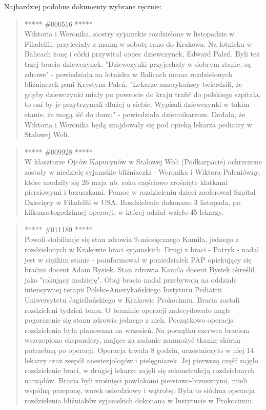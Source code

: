 \documentclass[11pt,a4paper]{article}
\begin{document}
Najbardziej podobne dokumenty wybrane ręcznie:

\begin{quote} ***** \#000516 *****\\ Wiktoria i Weronika, siostry syjamskie
rozdzielone w listopadzie w Filadelfii, przyleciały z mamą w sobotę rano do
Krakowa. Na lotnisku w Balicach żonę i córki przywitał ojciec dziewczynek,
Edward Paleń. Byli też trzej bracia dziewczynek.  "Dziewczynki przyjechały w
dobrym stanie, są zdrowe" - powiedziała na lotnisku w Balicach mama
rozdzielonych bliźniaczek pani Krystyna Paleń. "Lekarze amerykańscy twierdzili,
że gdyby dziewczynki miały po powrocie do kraju trafić do polskiego szpitala,
to oni by je przytrzymali dłużej u siebie. Wypisali dziewczynki w takim stanie,
że mogą iść do domu" - powiedziała dziennikarzom. Dodała, że Wiktoria i
Weronika będą znajdowały się pod opieką lekarza pediatry w Stalowej Woli.
\end{quote}

\begin{quote} ***** \#009928 *****\\ W klasztorze Ojców Kapucynów w Stalowej Woli
(Podkarpacie) ochrzczone zostały w niedzielę syjamskie bliźniaczki - Weronika i
Wiktora Paleniówny, które urodziły się 26 maja ub. roku częściowo zrośnięte
klatkami piersiowymi i brzuszkami. Pomoc w rozdzieleniu dzieci zaoferował
Szpital Dziecięcy w Filadelfii w USA.  Rozdzielenia dokonano 3 listopada, po
kilkunastogodzinnej operacji, w której udział wzięło 45 lekarzy.  \end{quote}

\begin{quote} ***** \#011189 *****\\ Powoli stabilizuje się stan zdrowia
9-miesięcznego Kamila, jednego z rozdzielonych w Krakowie braci syjamskich.
Drugi z braci - Patryk - nadal jest w ciężkim stanie - poinformował w
poniedziałek PAP opiekujący się braćmi docent Adam Bysiek.  Stan zdrowia Kamila
docent Bysiek określił jako "rokujący nadzieję". Obaj bracia nadal przebywają
na oddziale intensywnej terapii Polsko-Amerykańskiego Instytutu Pediatrii
Uniwersytetu Jagiellońskiego w Krakowie Prokocimiu.  Bracia zostali rozdzieleni
tydzień temu. O terminie operacji zadecydowało nagłe pogorszenie się stanu
zdrowia jednego z nich.  Początkowo operacja rozdzielenia była planowana na
wrzesień. Na początku czerwca braciom wszczepiono ekspandery, mające za zadanie
namnożyć tkankę skórną potrzebną po operacji.  Operacja trwała 8 godzin,
uczestniczyło w niej 14 lekarzy oraz zespół anestezjologów i pielęgniarek. Jej
pierwszą część zajęło rozdzielenie braci, w drugiej lekarze zajęli się
rekonstrukcją rozdzielonych narządów. Bracia byli zrośnięci powłokami
piersiowo-brzusznymi, mieli wspólną przeponę, worek osierdziowy i wątrobę.
Była to siódma operacja rozdzielenia bliźniaków syjamskich dokonana w
Instytucie w Prokocimiu.  \end{quote}
\end{document}

